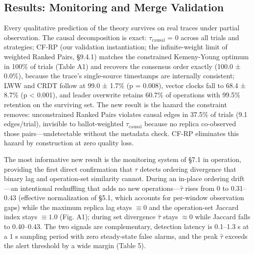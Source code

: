 \documentclass[11pt]{article}
\begin{document}
\subsection{Results: Monitoring and Merge Validation}
Every qualitative prediction of the theory survives on real traces under partial observation. The causal decomposition is exact: $\tau _{\mathrm{causal}}$ = 0 across all trials and strategies; CF-RP (our validation instantiation; the infinite-weight limit of weighted Ranked Pairs, §9.4.1) matches the constrained Kemeny-Young optimum in 100\% of trials (Table A1) and recovers the consensus order exactly (100.0 ± 0.0\%), because the trace's single-source timestamps are internally consistent; LWW and CRDT follow at 99.0 ± 1.7\% (p = 0.008), vector clocks fall to 68.4 ± 8.7\% (p < 0.001), and leader overwrite retains 60.7\% of operations with 99.5\% retention on the surviving set. The new result is the hazard the constraint removes: unconstrained Ranked Pairs violates causal edges in 37.5\% of trials (9.1 edges/trial), invisible to ballot-weighted $\tau _{\mathrm{causal}}$ because no replica co-observed those pairs—undetectable without the metadata check. CF-RP eliminates this hazard by construction at zero quality loss.

The most informative new result is the monitoring system of §7.1 in operation, providing the first direct confirmation that $\tau $ detects ordering divergence that binary lag and operation-set similarity cannot. During an in-place ordering drift—an intentional reshuffling that adds no new operations—$\hat{\tau}$ rises from 0 to 0.31–0.43 (effective normalization of §5.1, which accounts for per-window observation gaps) while the maximum replica lag stays $\equiv 0$ and the operation-set Jaccard index stays $\equiv 1.0$ (Fig. A1); during set divergence $\hat{\tau}$ stays $\approx 0$ while Jaccard falls to 0.40–0.43. The two signals are complementary, detection latency is 0.1–1.3 s at a 1 s sampling period with zero steady-state false alarms, and the peak $\hat{\tau}$ exceeds the alert threshold by a wide margin (Table 5).
\end{document}
